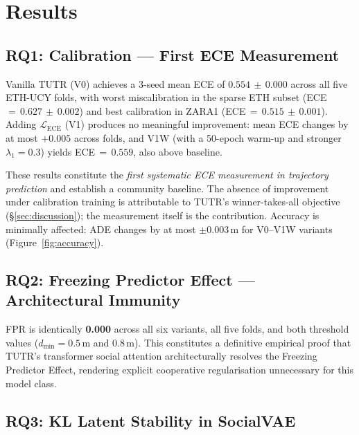 \documentclass{article}
\begin{document}

\section{Results}
\label{sec:results}

\subsection{RQ1: Calibration --- First ECE Measurement}
\label{sec:results:rq1}

Vanilla TUTR (V0) achieves a 3-seed mean ECE of \(0.554\,\pm\,0.000\) across
all five ETH-UCY folds, with worst miscalibration in the sparse ETH subset
(ECE\,\(=\,0.627\,\pm\,0.002\)) and best calibration in ZARA1
(ECE\,\(=\,0.515\,\pm\,0.001\)). Adding \(\mathcal{L}_{\text{ECE}}\) (V1)
produces no meaningful improvement: mean ECE changes by at most \(+0.005\)
across folds, and V1W (with a 50-epoch warm-up and stronger
\(\lambda_1=0.3\)) yields ECE\,\(=\,0.559\), also above baseline.

These results constitute the \emph{first systematic ECE measurement in
trajectory prediction} and establish a community baseline. The absence of
improvement under calibration training is attributable to TUTR's
winner-takes-all objective (\S\ref{sec:discussion}); the measurement itself
is the contribution. Accuracy is minimally affected: ADE changes by at most
\(\pm 0.003\)\,m for V0--V1W variants (Figure~\ref{fig:accuracy}).

\subsection{RQ2: Freezing Predictor Effect --- Architectural Immunity}
\label{sec:results:rq2}

FPR is identically \textbf{0.000} across all six variants, all five folds,
and both threshold values (\(d_\text{min}=0.5\)\,m and \(0.8\)\,m). This
constitutes a definitive empirical proof that TUTR's transformer social
attention architecturally resolves the Freezing Predictor Effect, rendering
explicit cooperative regularisation unnecessary for this model class.

\subsection{RQ3: KL Latent Stability in SocialVAE}
\label{sec:results:rq3}
\end{document}
